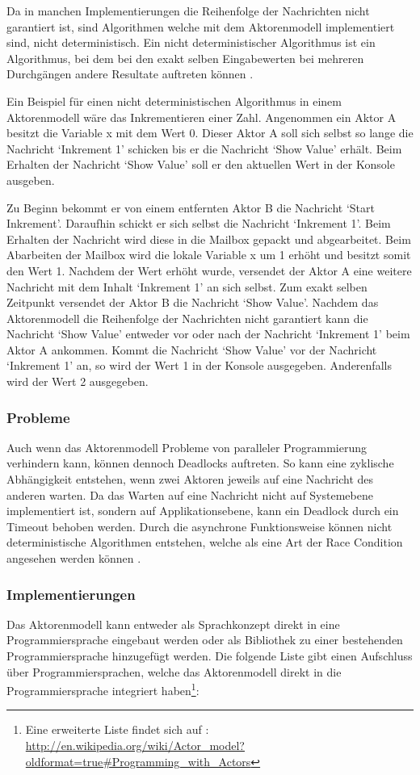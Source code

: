 Da in manchen Implementierungen die Reihenfolge der Nachrichten nicht garantiert ist, sind Algorithmen welche mit dem Aktorenmodell implementiert sind, nicht deterministisch. Ein nicht deterministischer Algorithmus ist ein Algorithmus, bei dem bei den exakt selben Eingabewerten bei mehreren Durchgängen andere Resultate auftreten können \cite[]{Agh85}. 

Ein Beispiel für einen nicht deterministischen Algorithmus in einem Aktorenmodell wäre das Inkrementieren einer Zahl. Angenommen ein Aktor A besitzt die Variable x mit dem Wert 0. Dieser Aktor A soll sich selbst so lange die Nachricht `Inkrement 1' schicken bis er die Nachricht `Show Value' erhält. Beim Erhalten der Nachricht `Show Value' soll er den aktuellen Wert in der Konsole ausgeben.

Zu Beginn bekommt er von einem entfernten Aktor B die Nachricht `Start Inkrement'. Daraufhin schickt er sich selbst die Nachricht `Inkrement 1'. Beim Erhalten der Nachricht wird diese in die Mailbox gepackt und abgearbeitet. Beim Abarbeiten der Mailbox wird die lokale Variable x um 1 erhöht und besitzt somit den Wert 1. Nachdem der Wert erhöht wurde, versendet der Aktor A eine weitere Nachricht mit dem Inhalt `Inkrement 1' an sich selbst. Zum exakt selben Zeitpunkt versendet der Aktor B die Nachricht `Show Value'. Nachdem das Aktorenmodell  die Reihenfolge der Nachrichten nicht garantiert kann die Nachricht `Show Value' entweder vor oder nach der Nachricht `Inkrement 1' beim Aktor A ankommen. Kommt die Nachricht `Show Value' vor der Nachricht `Inkrement 1' an, so wird der Wert 1 in der Konsole ausgegeben. Anderenfalls wird der Wert 2 ausgegeben.

\subsubsection{Probleme}
Auch wenn das Aktorenmodell Probleme von paralleler Programmierung verhindern kann, können dennoch Deadlocks auftreten. So kann eine zyklische Abhängigkeit entstehen, wenn zwei Aktoren jeweils auf eine Nachricht des anderen warten. Da das Warten auf eine Nachricht nicht auf Systemebene implementiert ist, sondern auf Applikationsebene, kann ein Deadlock durch ein Timeout behoben werden. Durch die asynchrone Funktionsweise können nicht deterministische Algorithmen entstehen, welche als eine Art der Race Condition angesehen werden können \cite[p. 86]{Erb2012}. 

\subsubsection{Implementierungen}
Das Aktorenmodell kann entweder als Sprachkonzept direkt in eine Programmiersprache eingebaut werden oder als Bibliothek zu einer bestehenden Programmiersprache hinzugefügt werden. Die folgende Liste gibt einen Aufschluss über Programmiersprachen, welche das Aktorenmodell direkt in die Programmiersprache integriert haben\footnote{Eine erweiterte Liste findet sich auf  \cite[p. 86]{Erb2012}: \url{http://en.wikipedia.org/wiki/Actor_model?oldformat=true#Programming_with_Actors}}:

